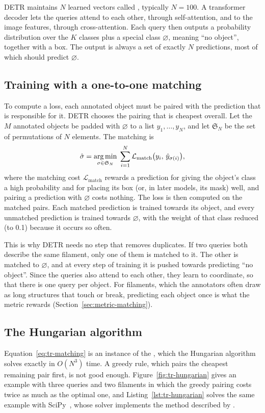 DETR maintains $N$ learned vectors called , typically $N=100$. A transformer
decoder lets the queries attend to each other, through self-attention, and to the image features,
through cross-attention. Each query then outputs a probability distribution over the $K$ classes plus
a special class $\varnothing$, meaning ``no object'', together with a box. The output is always a set
of exactly $N$ predictions, most of which should predict $\varnothing$.

\subsection{Training with a one-to-one matching}\label{sec:tr-matching}
To compute a loss, each annotated object must be paired with the prediction that is responsible for
it. DETR chooses the pairing that is cheapest overall. Let the $M$ annotated objects be padded with
$\varnothing$ to a list $y_1,\dots,y_N$, and let $\mathfrak{S}_N$ be the set of permutations of $N$
elements. The matching is
\begin{equation}
\hat\sigma = \operatorname*{arg\,min}_{\sigma\in\mathfrak{S}_N}\; \sum_{i=1}^{N} \mathcal{L}_{\text{match}}\big(y_i,\, \hat y_{\sigma(i)}\big),
\label{eq:tr-matching}
\end{equation}
where the matching cost $\mathcal{L}_{\text{match}}$ rewards a prediction for giving the object's
class a high probability and for placing its box (or, in later models, its mask) well, and pairing a
prediction with $\varnothing$ costs nothing. The loss is then computed on the matched pairs. Each
matched prediction is trained towards its object, and every unmatched prediction is trained towards
$\varnothing$, with the weight of that class reduced (to 0.1) because it occurs so often.

This is why DETR needs no step that removes duplicates. If two queries both describe the same
filament, only one of them is matched to it. The other is matched to $\varnothing$, and at every step
of training it is pushed towards predicting ``no object''. Since the queries also attend to each
other, they learn to coordinate, so that there is one query per object. For filaments, which the
annotators often draw as long structures that touch or break, predicting each object once is what the
metric rewards (Section~\ref{sec:metric-matching}).

\subsection{The Hungarian algorithm}\label{sec:tr-hungarian}
Equation~\eqref{eq:tr-matching} is an instance of the , which the
Hungarian algorithm~\citep{kuhn,munkres1957} solves exactly in $O(N^3)$ time. A greedy rule, which
pairs the cheapest remaining pair first, is not good enough. Figure~\ref{fig:tr-hungarian} gives an
example with three queries and two filaments in which the greedy pairing costs twice as much as the
optimal one, and Listing~\ref{lst:tr-hungarian} solves the same example with
SciPy~\citep{virtanen2020}, whose solver implements the method described by \citet{crouse2016}.

